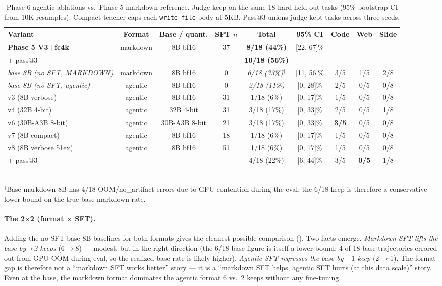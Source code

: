 \documentclass[11pt]{article}
\begin{document}
\begin{table}[t]
\centering
\caption{Phase 6 agentic ablations vs.\ Phase 5 markdown reference. Judge-keep on the same 18 hard held-out tasks (95\% bootstrap CI from 10K resamples). Compact teacher caps each \texttt{write\_file} body at 5KB. Pass@3 unions judge-kept tasks across three seeds.}
\label{tab:agentic-grid}
\small
\begin{tabular}{lcccccccc}
\toprule
Variant & Format & Base / quant. & SFT $n$ & Total & 95\% CI & Code & Web & Slide \\
\midrule
\textbf{Phase 5 V3+fc4k} & markdown & 8B bf16 & 37 & \textbf{8/18 (44\%)} & [22, 67]\% & --- & --- & --- \\
\quad + pass@3 & & & & \textbf{10/18 (56\%)} & --- & --- & --- & --- \\
\midrule
\textit{base 8B (no SFT, MARKDOWN)} & markdown & 8B bf16 & 0 & \textit{6/18 (33\%)$^{\dagger}$} & [11, 56]\% & 3/5 & 1/5 & 2/8 \\
\textit{base 8B (no SFT, agentic)} & agentic & 8B bf16 & 0 & \textit{2/18 (11\%)} & [0, 28]\% & 2/5 & 0/5 & 0/8 \\
v3 (8B verbose) & agentic & 8B bf16 & 31 & 1/18 (6\%) & [0, 17]\% & 1/5 & 0/5 & 0/8 \\
v4 (32B 4-bit) & agentic & 32B 4-bit & 31 & 3/18 (17\%) & [0, 33]\% & 2/5 & 0/5 & 1/8 \\
v6 (30B-A3B 8-bit) & agentic & 30B-A3B 8-bit & 21 & 3/18 (17\%) & [0, 33]\% & \textbf{3/5} & 0/5 & 0/8 \\
v7 (8B compact) & agentic & 8B bf16 & 18 & 1/18 (6\%) & [0, 17]\% & 1/5 & 0/5 & 0/8 \\
v8 (8B verbose 51ex) & agentic & 8B bf16 & 51 & 1/18 (6\%) & [0, 17]\% & 1/5 & 0/5 & 0/8 \\
\quad + pass@3 & & & & 4/18 (22\%) & [6, 44]\% & 3/5 & \textbf{0/5} & 1/8 \\
\bottomrule
\end{tabular}
\\[2pt]
{\footnotesize $^{\dagger}$Base markdown 8B has 4/18 OOM/no\_artifact errors due to GPU contention during the eval; the 6/18 keep is therefore a conservative lower bound on the true base markdown rate.}
\end{table}

\paragraph{The 2$\times$2 (format $\times$ SFT).} Adding the no-SFT base 8B baselines for both formats gives the cleanest possible comparison (). Two facts emerge.
\textit{Markdown SFT lifts the base by +2 keeps} (6$\to$8) --- modest, but in the right direction (the 6/18 base figure is itself a lower bound; 4 of 18 base trajectories errored out from GPU OOM during eval, so the realized base rate is likely higher).
\textit{Agentic SFT regresses the base by $-1$ keep} (2$\to$1). The format gap is therefore not a ``markdown SFT works better'' story --- it is a ``markdown SFT helps, agentic SFT hurts (at this data scale)'' story. Even at the base, the markdown format dominates the agentic format 6 vs.\ 2 keeps without any fine-tuning.
\end{document}
